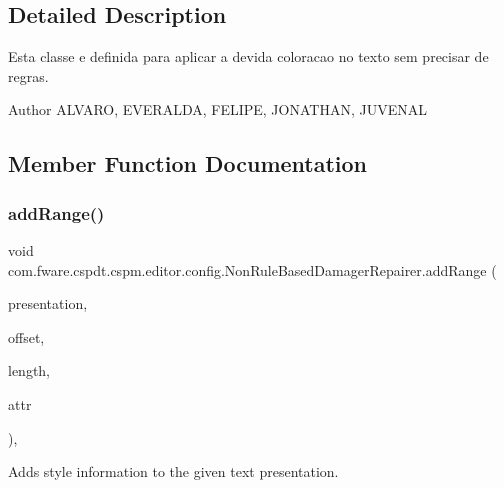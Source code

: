 \subsection{Detailed Description}
Esta classe e definida para aplicar a devida coloracao no texto sem precisar de regras. 

\begin{DoxyAuthor}{Author}
A\+L\+V\+A\+RO, E\+V\+E\+R\+A\+L\+DA, F\+E\+L\+I\+PE, J\+O\+N\+A\+T\+H\+AN, J\+U\+V\+E\+N\+AL 
\end{DoxyAuthor}


\subsection{Member Function Documentation}
\mbox{\label{classcom_1_1fware_1_1cspdt_1_1cspm_1_1editor_1_1config_1_1_non_rule_based_damager_repairer_a0fed10472da4fc71c06b37826c25b247}} 
\subsubsection{\texorpdfstring{add\+Range()}{addRange()}}
{\footnotesize\ttfamily void com.\+fware.\+cspdt.\+cspm.\+editor.\+config.\+Non\+Rule\+Based\+Damager\+Repairer.\+add\+Range (\begin{DoxyParamCaption}\item[{Text\+Presentation}]{presentation,  }\item[{int}]{offset,  }\item[{int}]{length,  }\item[{Text\+Attribute}]{attr }\end{DoxyParamCaption})\hspace{0.3cm}{\ttfamily [inline]}, {\ttfamily [protected]}}



Adds style information to the given text presentation. 


